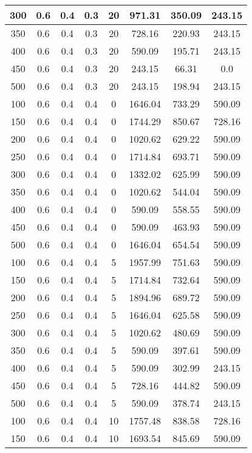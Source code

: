 \documentclass[a4paper, 12pt]{extreport}
\begin{document}
\begin{itemize}
\begin{longtable}{|c|c|c|c|c|c|c|c|}
			300 & 0.6 & 0.4 & 0.3 & 20 & 971.31 & 350.09 & 243.15 \\\hline
			350 & 0.6 & 0.4 & 0.3 & 20 & 728.16 & 220.93 & 243.15 \\\hline
			400 & 0.6 & 0.4 & 0.3 & 20 & 590.09 & 195.71 & 243.15 \\\hline
			450 & 0.6 & 0.4 & 0.3 & 20 & 243.15 & 66.31 & 0.0 \\\hline
			500 & 0.6 & 0.4 & 0.3 & 20 & 243.15 & 198.94 & 243.15 \\\hline
			100 & 0.6 & 0.4 & 0.4 & 0 & 1646.04 & 733.29 & 590.09 \\\hline
			150 & 0.6 & 0.4 & 0.4 & 0 & 1744.29 & 850.67 & 728.16 \\\hline
			200 & 0.6 & 0.4 & 0.4 & 0 & 1020.62 & 629.22 & 590.09 \\\hline
			250 & 0.6 & 0.4 & 0.4 & 0 & 1714.84 & 693.71 & 590.09 \\\hline
			300 & 0.6 & 0.4 & 0.4 & 0 & 1332.02 & 625.99 & 590.09 \\\hline
			350 & 0.6 & 0.4 & 0.4 & 0 & 1020.62 & 544.04 & 590.09 \\\hline
			400 & 0.6 & 0.4 & 0.4 & 0 & 590.09 & 558.55 & 590.09 \\\hline
			450 & 0.6 & 0.4 & 0.4 & 0 & 590.09 & 463.93 & 590.09 \\\hline
			500 & 0.6 & 0.4 & 0.4 & 0 & 1646.04 & 654.54 & 590.09 \\\hline
			100 & 0.6 & 0.4 & 0.4 & 5 & 1957.99 & 751.63 & 590.09 \\\hline
			150 & 0.6 & 0.4 & 0.4 & 5 & 1714.84 & 732.64 & 590.09 \\\hline
			200 & 0.6 & 0.4 & 0.4 & 5 & 1894.96 & 689.72 & 590.09 \\\hline
			250 & 0.6 & 0.4 & 0.4 & 5 & 1646.04 & 625.58 & 590.09 \\\hline
			300 & 0.6 & 0.4 & 0.4 & 5 & 1020.62 & 480.69 & 590.09 \\\hline
			350 & 0.6 & 0.4 & 0.4 & 5 & 590.09 & 397.61 & 590.09 \\\hline
			400 & 0.6 & 0.4 & 0.4 & 5 & 590.09 & 302.99 & 243.15 \\\hline
			450 & 0.6 & 0.4 & 0.4 & 5 & 728.16 & 444.82 & 590.09 \\\hline
			500 & 0.6 & 0.4 & 0.4 & 5 & 590.09 & 378.74 & 243.15 \\\hline
			100 & 0.6 & 0.4 & 0.4 & 10 & 1757.48 & 838.58 & 728.16 \\\hline
			150 & 0.6 & 0.4 & 0.4 & 10 & 1693.54 & 845.69 & 590.09 \\\hline

\end{longtable}
\end{itemize}
\end{document}
